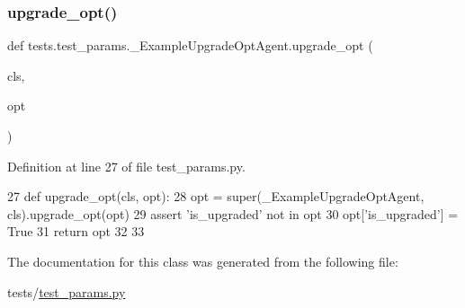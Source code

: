 \subsubsection{\texorpdfstring{upgrade\+\_\+opt()}{upgrade\_opt()}}
{\footnotesize\ttfamily def tests.\+test\+\_\+params.\+\_\+\+Example\+Upgrade\+Opt\+Agent.\+upgrade\+\_\+opt (\begin{DoxyParamCaption}\item[{}]{cls,  }\item[{}]{opt }\end{DoxyParamCaption})}



Definition at line 27 of file test\+\_\+params.\+py.


\begin{DoxyCode}
27     \textcolor{keyword}{def }upgrade\_opt(cls, opt):
28         opt = super(\_ExampleUpgradeOptAgent, cls).upgrade\_opt(opt)
29         \textcolor{keyword}{assert} \textcolor{stringliteral}{'is\_upgraded'} \textcolor{keywordflow}{not} \textcolor{keywordflow}{in} opt
30         opt[\textcolor{stringliteral}{'is\_upgraded'}] = \textcolor{keyword}{True}
31         \textcolor{keywordflow}{return} opt
32 
33 
\end{DoxyCode}


The documentation for this class was generated from the following file\+:\begin{DoxyCompactItemize}
\item 
tests/\hyperlink{test__params_8py}{test\+\_\+params.\+py}\end{DoxyCompactItemize}
